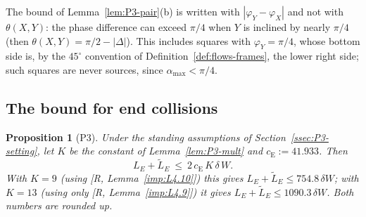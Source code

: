 \documentclass[11pt]{amsart}
\newcommand{\amax}{\alpha_{\max}}
\newtheorem{proposition}[theorem]{Proposition}
\theoremstyle{definition}
\theoremstyle{remark}
\numberwithin{equation}{section}
\begin{document}
The bound of Lemma~\ref{lem:P3-pair}(b) is written with $|\varphi_Y-\varphi_X|$ and not with $\theta(X,Y)$: the phase difference can exceed $\pi/4$ when $Y$ is inclined by nearly $\pi/4$ (then $\theta(X,Y)=\pi/2-|\Delta|$). This includes squares with $\varphi_Y=\pi/4$, whose bottom side is, by the $45^\circ$ convention of Definition~\ref{def:flows-frames}, the lower right side; such squares are never sources, since $\amax<\pi/4$.

\subsection{The bound for end collisions}\label{ssec:P3-prop}

\begin{proposition}[P3]\label{prop:P3}
Under the standing assumptions of Section~\ref{ssec:P3-setting}, let $K$ be the constant of Lemma~\ref{lem:P3-mult} and $c_{\mathrm E}:=41.933$. Then
\[
L_E+\tilde L_E\ \le\ 2\,c_{\mathrm E}\,K\,\delta\,W .
\]
With $K=9$ (using [R, Lemma~\ref{imp:L4.10}]) this gives $L_E+\tilde L_E\le754.8\,\delta W$; with $K=13$ (using only [R, Lemma~\ref{imp:L4.9}]) it gives $L_E+\tilde L_E\le1090.3\,\delta W$. Both numbers are rounded up.
\end{proposition}
\end{document}
